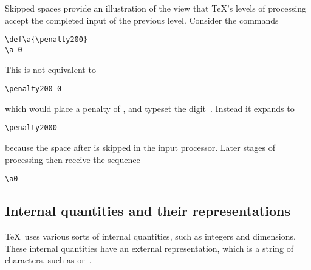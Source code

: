 \documentclass[letterpaper]{book}
\begin{document}
Skipped spaces provide an illustration of the view that
\TeX's levels of processing accept the completed input
of the previous level. Consider the commands
\begin{verbatim}
\def\a{\penalty200}
\a 0
\end{verbatim} 
This is {\italic not\/} equivalent to
\begin{verbatim}
\penalty200 0
\end{verbatim} 
which would place a penalty of , and
typeset the digit~. Instead it expands to
\begin{verbatim}
\penalty2000
\end{verbatim}
because the space after  is skipped in the
input processor. Later stages of processing then receive
the sequence \begin{verbatim}
\a0
\end{verbatim}

\subsection{Internal quantities and their representations}

\TeX\ uses various sorts of internal quantities,
such as integers and dimensions. These internal
quantities have an external representation,
which is a string of characters, such as 
 or~\n{91.44cm}.
\end{document}
